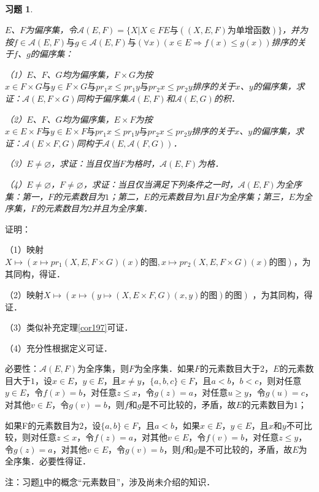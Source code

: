 \documentclass[12pt, a4paper, oneside]{book}
\newtheorem{exer}{习题}
\begin{document}
			\begin{exer}\label{exer82}
				\hfill\par
				$E$、$F$为偏序集，令$\mathcal{A}(E, F)=\{X|X\in FE\text{与}((X, E, F)\text{为单增函数})\}$，并为按$f\in \mathcal{A}(E, F)\text{与}g\in \mathcal{A}(E, F)\text{与}(\forall x)(x\in E\Rightarrow f(x)\leq g(x))$排序的关于$f$、$g$的偏序集：
				\par
				（1）$E$、$F$、$G$均为偏序集，$F\times G$为按$x\in F\times G\text{与}y\in F\times G\text{与}pr_1x\leq pr_1y\text{与}pr_2x\leq pr_2y$排序的关于$x$、$y$的偏序集，求证：$\mathcal{A}(E, F\times G)$同构于偏序集$\mathcal{A}(E, F)$和$\mathcal{A}(E, G)$的积．
				\par
				（2）$E$、$F$、$G$均为偏序集，$E\times F$为按$x\in E\times F\text{与}y\in E\times F\text{与}pr_1x\leq pr_1y\text{与}pr_2x\leq pr_2y$排序的关于$x$、$y$的偏序集，求证：$\mathcal{A}(E\times F, G)$同构于$\mathcal{A}(E, \mathcal{A}(F, G))$．
				\par
				（3）$E\neq \varnothing$，求证：当且仅当$F$为格时，$\mathcal{A}(E, F)$为格．
				\par
				（4）$E\neq \varnothing$，$F\neq \varnothing$，求证：当且仅当满足下列条件之一时，$\mathcal{A}(E, F)$为全序集：第一，$F$的元素数目为$1$；第二，$E$的元素数目为$1$且$F$为全序集；第三，$E$为全序集，$F$的元素数目为$2$并且为全序集．
			\end{exer}
			证明：
			\par
			（1）映射$X\mapsto (x\mapsto pr_1(X, E, F\times G)(x)\text{的图}, x\mapsto pr_2(X, E, F\times G)(x)\text{的图})$，为其同构，得证．
			\par
			（2）映射$X\mapsto (x\mapsto (y\mapsto (X, E\times F, G)(x, y)\text{的图})\text{的图})$ ，为其同构，得证．
			\par
			（3）类似补充定理\ref{cor197}可证．
			\par
			（4）充分性根据定义可证．
			\par
			必要性：$\mathcal{A}(E, F)$为全序集，则$F$为全序集．如果$F$的元素数目大于$2$，$E$的元素数目大于$1$，设$x\in E$，$y\in E$，且$x\neq y$，$\{a, b, c\}\in F$，且$a<b$，$b<c$，则对任意$y\in E$，令$f(x)=b$，对任意$z\leq x$，令$g(z)=a$，对任意$u\geq y$，令$g(u)=c$，对其他$v\in E$，令$g(v)=b$，则$f$和$g$是不可比较的，矛盾，故$E$的元素数目为$1$；
			\par
			如果F的元素数目为$2$，设$\{a, b\}\in F$，且$a<b$，如果$x\in E$，$y\in E$，且$x$和$y$不可比较，则对任意$z\leq x$，令$f(z)=a$，对其他$v\in E$，令$f(v)=b$，对任意$z\leq y$，令$g(z)=a$，对其他$v\in E$，令$g(v)=b$，则$f$和$g$是不可比较的，矛盾，故$E$为全序集．必要性得证．
			\par
			注：习题\ref{exer82}中的概念“元素数目”，涉及尚未介绍的知识．	
			
\end{document}
